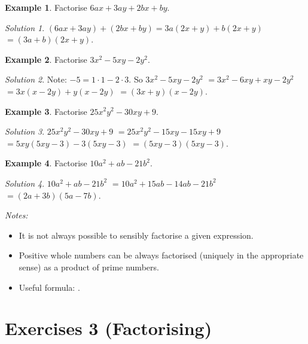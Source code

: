 \documentclass[
  12pt,
  oneside]{book}
\providecommand{\tightlist}{%
  \setlength{\itemsep}{0pt}\setlength{\parskip}{0pt}}
\theoremstyle{definition}
\theoremstyle{definition}
\newtheorem{example}{Example}[chapter]
\theoremstyle{definition}
\theoremstyle{definition}
\theoremstyle{remark}
\newtheorem*{solution}{Solution}
\begin{document}
\begin{example}
Factorise \(6ax+3ay+2bx+by\).
\end{example}

\begin{solution}
\((6ax+3ay)+(2bx+by) = 3a(2x+y)+b(2x+y)\) \(=(3a+b)(2x+y)\).
\end{solution}

\begin{example}
Factorise \(3x^2-5xy-2y^2\).
\end{example}

\begin{solution}
Note: \(-5=1\cdot 1-2\cdot 3\).
So \(3x^2-5xy-2y^2\) \(=3x^2- 6xy + xy-2y^2\) \(=3x(x-2y)+y(x-2y)\) \(=(3x+y)(x-2y)\).
\end{solution}

\begin{example}
Factorise \(25x^2y^2-30xy+9\).
\end{example}

\begin{solution}
\(25x^2y^2-30xy+9\) \(=25x^2y^2 -15xy -15xy +9\) \(=5xy(5xy-3)-3(5xy-3)\) \(=(5xy-3)(5xy-3)\).
\end{solution}

\begin{example}
Factorise \(10a^2+ab-21b^2\).
\end{example}

\begin{solution}
\(10a^2+ab-21b^2\) \(=10a^2 +15ab - 14ab -21b^2\) \(=(2a+3b)(5a-7b)\).
\end{solution}

\emph{Notes:}

\begin{itemize}
\tightlist
\item
  It is not always possible to sensibly factorise a given expression.
\item
  Positive whole numbers can be always factorised (uniquely in the appropriate sense) as a product of prime numbers.
\item
  Useful formula: .
\end{itemize}

\hypertarget{exercises-3-factorising}{%
\chapter*{Exercises 3 (Factorising)}\label{exercises-3-factorising}}
\end{document}
